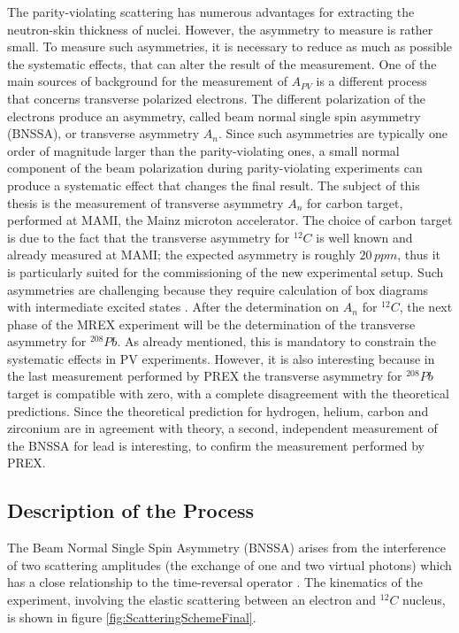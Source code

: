 The parity-violating scattering has numerous advantages for extracting the neutron-skin thickness of nuclei. However, the asymmetry to measure is rather small. To measure such asymmetries, it is necessary to reduce as much as possible the systematic effects, that can alter the result of the measurement. One of the main sources of background for the measurement of $A_{PV}$ is a different process that concerns transverse polarized electrons. The different polarization of the electrons produce an asymmetry, called beam normal single spin asymmetry (BNSSA), or transverse asymmetry $A_{n}$. Since such asymmetries are typically one order of magnitude larger than the parity-violating ones, a small normal component of the beam polarization during parity-violating experiments can produce a systematic effect that changes the final result. The subject of this thesis is the measurement of transverse asymmetry $A_{n}$ for carbon target, performed at MAMI, the Mainz microton accelerator. The choice of carbon target is due to the fact that the transverse asymmetry for $^{12}C$ is well known and already measured at MAMI; the expected asymmetry is roughly $20 \, ppm$, thus it is particularly suited for the commissioning of the new experimental setup. Such asymmetries are challenging because they require calculation of box diagrams with intermediate excited states \cite{Gorchtein_2008}. After the determination on $A_{n}$ for $^{12}C$, the next phase of the MREX experiment will be the determination of the transverse asymmetry for $^{208}Pb$. As already mentioned, this is mandatory to constrain the systematic effects in PV experiments. However, it is also interesting because in the last measurement performed by PREX \cite{HAPPEX:2012fud} the transverse asymmetry for $^{208}Pb$ target is compatible with zero, with a complete disagreement with the theoretical predictions. Since the theoretical prediction for hydrogen, helium, carbon and zirconium are in agreement with theory, a second, independent measurement of the BNSSA for lead is interesting, to confirm the measurement performed by PREX.  

\subsection{Description of the Process}

The Beam Normal Single Spin Asymmetry (BNSSA) arises from the interference of two scattering amplitudes (the exchange of one and two virtual photons) which has a close relationship to the time-reversal operator \cite{Gorchtein_2008}. 
The kinematics of the experiment, involving the elastic scattering between an electron and $^{12}C$ nucleus, is shown in figure \ref{fig:ScatteringSchemeFinal}.

